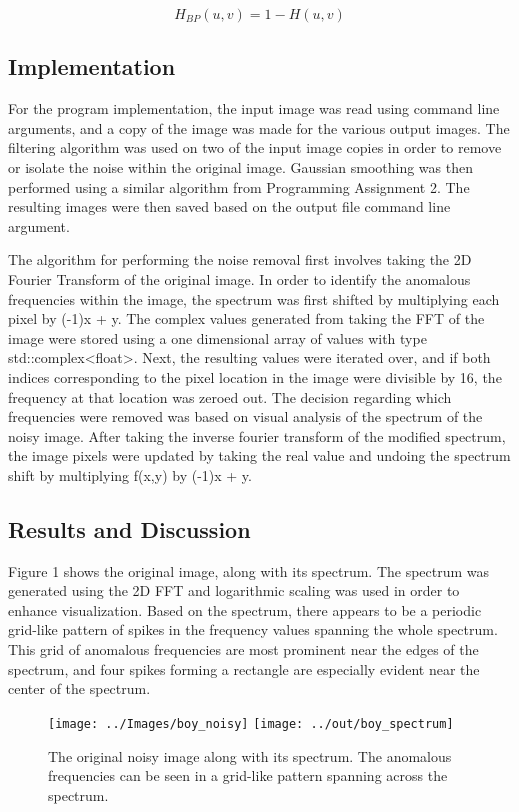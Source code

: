 \documentclass[headings=optiontoheadandtoc,listof=totoc,parskip=full]{scrartcl}
\begin{document}
\[
	H_{BP}(u,v) = 1 - H(u,v)
\]


\subsection{Implementation}

For the program implementation, the input image was read using command line arguments, and a copy of the image was made for the various output images. The filtering algorithm was used on two of the input image copies in order to remove or isolate the noise within the original image. Gaussian smoothing was then performed using a similar algorithm from Programming Assignment 2. The resulting images were then saved based on the output file command line argument.

The algorithm for performing the noise removal first involves taking the 2D Fourier Transform of the original image. In order to identify the anomalous frequencies within the image, the spectrum was first shifted by multiplying each pixel by (-1)x + y. The complex values generated from taking the FFT of the image were stored using a one dimensional array of values with type std::complex<float>. Next, the resulting values were iterated over, and if both indices corresponding to the pixel location in the image were divisible by 16, the frequency at that location was zeroed out. The decision regarding which frequencies were removed was based on visual analysis of the spectrum of the noisy image. After taking the inverse fourier transform of the modified spectrum, the image pixels were updated by taking the real value and undoing the spectrum shift by multiplying f(x,y) by (-1)x + y.

\subsection{Results and Discussion}

Figure 1 shows the original image, along with its spectrum. The spectrum was generated using the 2D FFT and logarithmic scaling was used in order to enhance visualization. Based on the spectrum, there appears to be a periodic grid-like pattern of spikes in the frequency values spanning the whole spectrum. This grid of anomalous frequencies are most prominent near the edges of the spectrum, and four spikes forming a rectangle are especially evident near the center of the spectrum. 

\begin{figure}[H]
	\centering
	\texttt{[image: ../Images/boy\_noisy]}
	\texttt{[image: ../out/boy\_spectrum]}
	\caption{The original noisy image along with its spectrum. The anomalous frequencies can be seen in a grid-like pattern spanning across the spectrum.}
	\label{fig:boyNoisy}
\end{figure}
\end{document}

